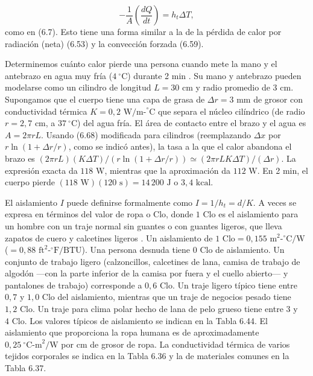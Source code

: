 \documentclass[12pt]{book}
\begin{document}
\begin{equation}
-\frac{1}{A}\left(\frac{dQ}{dt}\right) = h_t \Delta T,
\label{eq:669}
\end{equation}
como en (6.7). Esto tiene una forma similar a la de la pérdida de calor por radiación (neta) (6.53) y la convección forzada (6.59).

Determinemos cuánto calor pierde una persona cuando mete la mano y el antebrazo en agua muy fría ($4\ ^\circ$C) durante 2 min \cite{2}. Su mano y antebrazo pueden modelarse como un cilindro de longitud $L = 30\text{ cm}$ y radio promedio de $3\text{ cm}$. Supongamos que el cuerpo tiene una capa de grasa de $\Delta r = 3\text{ mm}$ de grosor con conductividad térmica $K = 0{,}2\text{ W/m-}^\circ\text{C}$ que separa el núcleo cilíndrico (de radio $r = 2{,}7\text{ cm}$, a $37\ ^\circ$C) del agua fría. El área de contacto entre el brazo y el agua es $A = 2\pi r L$. Usando (6.68) modificada para cilindros (reemplazando $\Delta x$ por $r\ln(1 + \Delta r/r)$, como se indicó antes), la tasa a la que el calor abandona el brazo es $(2\pi r L)(K \Delta T)/(r\ln(1 + \Delta r/r)) \simeq (2\pi r L K \Delta T)/(\Delta r)$. La expresión exacta da $118\text{ W}$, mientras que la aproximación da $112\text{ W}$. En 2 min, el cuerpo pierde $(118\text{ W})(120\text{ s}) = 14\,200\text{ J}$ o $3{,}4\text{ kcal}$.

El aislamiento $I$ puede definirse formalmente como $I = 1/h_t = d/K$. A veces se expresa en términos del valor de ropa o Clo, donde $1\text{ Clo}$ es el aislamiento para un hombre con un traje normal sin guantes o con guantes ligeros, que lleva zapatos de cuero y calcetines ligeros \cite{10,22}. Un aislamiento de $1\text{ Clo} = 0{,}155\text{ m}^2\text{-}^\circ\text{C/W}$ ($= 0{,}88\text{ ft}^2\text{-}^\circ\text{F/BTU}$). Una persona desnuda tiene $0\text{ Clo}$ de aislamiento. Un conjunto de trabajo ligero (calzoncillos, calcetines de lana, camisa de trabajo de algodón ---con la parte inferior de la camisa por fuera y el cuello abierto--- y pantalones de trabajo) corresponde a $0{,}6\text{ Clo}$. Un traje ligero típico tiene entre $0{,}7$ y $1{,}0\text{ Clo}$ del aislamiento, mientras que un traje de negocios pesado tiene $1{,}2\text{ Clo}$. Un traje para clima polar hecho de lana de pelo grueso tiene entre $3$ y $4\text{ Clo}$. Los valores típicos de aislamiento se indican en la Tabla 6.44. El aislamiento que proporciona la ropa humana es de aproximadamente $0{,}25\ ^\circ\text{C-m}^2/\text{W}$ por cm de grosor de ropa. La conductividad térmica de varios tejidos corporales se indica en la Tabla 6.36 y la de materiales comunes en la Tabla 6.37.
\end{document}
